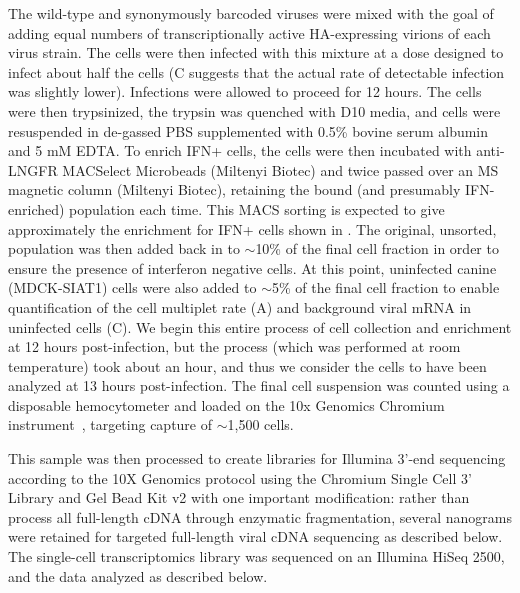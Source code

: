 \documentclass[9pt,lineno]{elife}
\begin{document}
The wild-type and synonymously barcoded viruses were mixed with the goal of adding equal numbers of transcriptionally active HA-expressing virions of each virus strain.
The cells were then infected with this mixture at a dose designed to infect about half the cells (C suggests that the actual rate of detectable infection was slightly lower).
Infections were allowed to proceed for 12 hours.
The cells were then trypsinized, the trypsin was quenched with D10 media, and cells were resuspended in de-gassed PBS supplemented with 0.5\% bovine serum albumin and 5 mM EDTA. 
To enrich IFN+ cells, the cells were then incubated with anti-LNGFR MACSelect Microbeads (Miltenyi Biotec) and twice passed over an MS magnetic column (Miltenyi Biotec), retaining the bound (and presumably IFN-enriched) population each time. 
This MACS sorting is expected to give approximately the enrichment for IFN+ cells shown in .
The original, unsorted, population was then added back in to $\sim$10\% of the final cell fraction in order to ensure the presence of interferon negative cells. 
At this point, uninfected canine (MDCK-SIAT1) cells were also added to $\sim$5\% of the final cell fraction to enable quantification of the cell multiplet rate (A) and background viral mRNA in uninfected cells (C). 
We begin this entire process of cell collection and enrichment at 12 hours post-infection, but the process (which was performed at room temperature) took about an hour, and thus we consider the cells to have been analyzed at 13 hours post-infection.
The final cell suspension was counted using a disposable hemocytometer and loaded on the 10x Genomics Chromium instrument~\citep{zheng2017massively}, targeting capture of $\sim$1,500 cells. 

This sample was then processed to create libraries for Illumina 3'-end sequencing according to the 10X Genomics protocol using the Chromium Single Cell 3' Library and Gel Bead Kit v2 with one important modification: rather than process all full-length cDNA through enzymatic fragmentation, several nanograms were retained for targeted full-length viral cDNA sequencing as described below.
The single-cell transcriptomics library was sequenced on an Illumina HiSeq 2500, and the data analyzed as described below.
\end{document}
